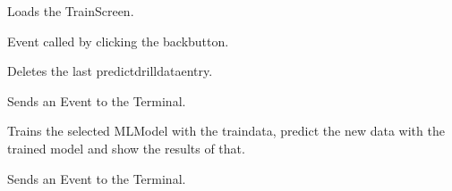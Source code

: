 \documentclass[letterpaper,10pt,english]{sphinxmanual}
\begin{document}
\begin{fulllineitems}
\begin{fulllineitems}
\end{fulllineitems}


\begin{fulllineitems}
\label{\detokenize{anoog.automation:anoog.automation.graphical_user_interface.Predict_Window.event_back}}
\sphinxAtStartPar
Loads the Train\sphinxhyphen{}Screen.

\sphinxAtStartPar
Event called by clicking the back\sphinxhyphen{}button.

\end{fulllineitems}


\begin{fulllineitems}
\label{\detokenize{anoog.automation:anoog.automation.graphical_user_interface.Predict_Window.event_delete_last_button}}
\sphinxAtStartPar
Deletes the last predict\sphinxhyphen{}drill\sphinxhyphen{}data\sphinxhyphen{}entry.

\sphinxAtStartPar
Sends an Event to the Terminal.

\end{fulllineitems}


\begin{fulllineitems}
\label{\detokenize{anoog.automation:anoog.automation.graphical_user_interface.Predict_Window.event_predict_button}}
\sphinxAtStartPar
Trains the selected ML\sphinxhyphen{}Model with the train\sphinxhyphen{}data, predict the new data with the trained model and show the results of that.

\sphinxAtStartPar
Sends an Event to the Terminal.


\end{fulllineitems}
\end{fulllineitems}
\end{document}
